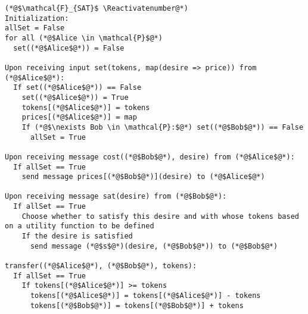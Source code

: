 \Suppressnumber
\begin{lstlisting}[label=satfunc, style=numbers]
(*@$\mathcal{F}_{SAT}$ \Reactivatenumber@*)
Initialization:
allSet = False
for all (*@$Alice \in \mathcal{P}$@*)
  set((*@$Alice$@*)) = False

Upon receiving input set(tokens, map(desire => price)) from (*@$Alice$@*):
  If set((*@$Alice$@*)) == False
    set((*@$Alice$@*)) = True
    tokens[(*@$Alice$@*)] = tokens
    prices[(*@$Alice$@*)] = map
    If (*@$\nexists Bob \in \mathcal{P}:$@*) set((*@$Bob$@*)) == False
      allSet = True

Upon receiving message cost((*@$Bob$@*), desire) from (*@$Alice$@*):
  If allSet == True
    send message prices[(*@$Bob$@*)](desire) to (*@$Alice$@*)

Upon receiving message sat(desire) from (*@$Bob$@*):
  If allSet == True
    Choose whether to satisfy this desire and with whose tokens based on a utility function to be defined
    If the desire is satisfied
      send message (*@$s$@*)(desire, (*@$Bob$@*)) to (*@$Bob$@*)

transfer((*@$Alice$@*), (*@$Bob$@*), tokens):
  If allSet == True
    If tokens[(*@$Alice$@*)] >= tokens
      tokens[(*@$Alice$@*)] = tokens[(*@$Alice$@*)] - tokens
      tokens[(*@$Bob$@*)] = tokens[(*@$Bob$@*)] + tokens
\end{lstlisting}
